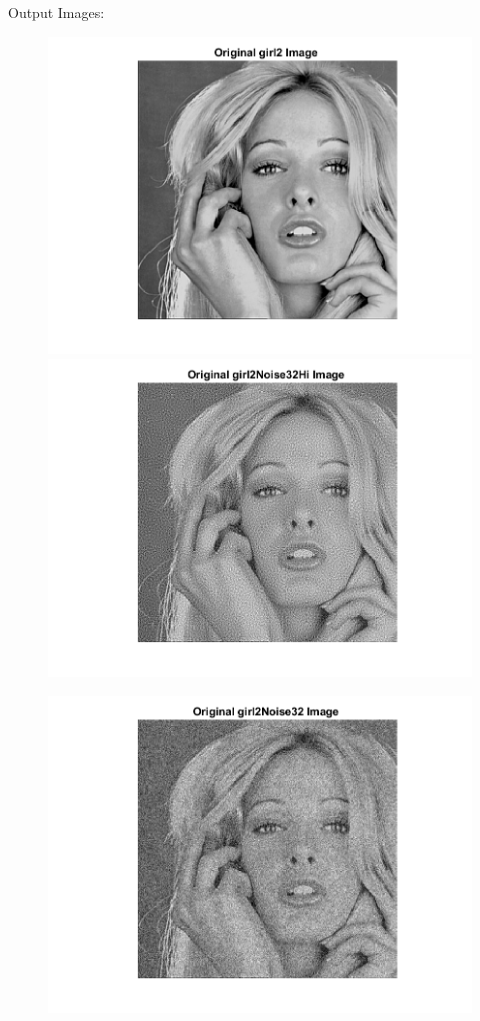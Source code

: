 \documentclass[11pt]{article} %
\begin{document}
Output Images: 
\begin{figure}
 \centering
	\includegraphics{2aa.png}
	\includegraphics{2ab.png}
\end{figure}
\begin{figure}
 \centering
	\includegraphics{2ac.png}
\end{figure}
\clearpage
\end{document}
